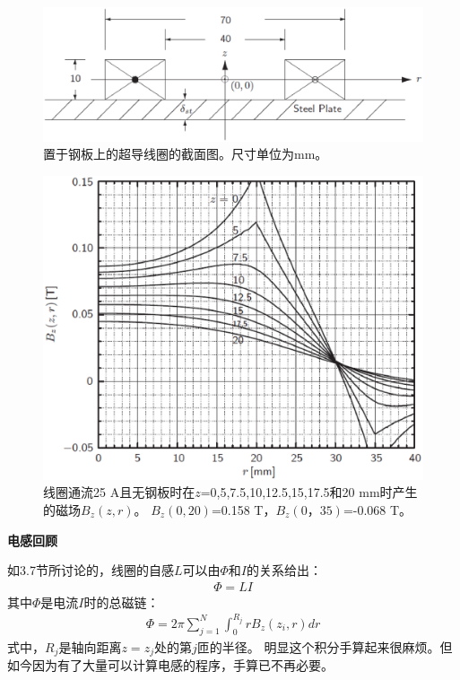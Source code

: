 \begin{figure}
	\centering
	\includegraphics[scale=0.5]{chpt9/figs/fig9.6.eps}
	\caption{置于钢板上的超导线圈的截面图。尺寸单位为mm。}
\end{figure}


\begin{figure}
	\centering
	\includegraphics[scale=0.5]{chpt9/figs/fig9.7.eps}
	\caption{线圈通流25 A且无钢板时在$z$=0,5,7.5,10,12.5,15,17.5和20 mm时产生的磁场$B_z(z,r)$。
		$B_z(0,20)$=0.158 T，$B_z(0，35)$=-0.068 T。}
\end{figure}

\textbf{电感回顾}

如3.7节所讨论的，线圈的自感$L$可以由$\Phi$和$I$的关系给出：
\begin{align*}%
\Phi=LI \tag{3.78}
\end{align*}
其中$\Phi$是电流$I$时的总磁链：
\begin{align*}%
\Phi=2\pi\sum_{j=1}^{N}\int_{0}^{R_j}rB_z(z_i,r)dr \tag{9.1}
\end{align*}
式中，$R_j$是轴向距离$z=z_j$处的第$j$匝的半径。
明显这个积分手算起来很麻烦。但如今因为有了大量可以计算电感的程序，手算已不再必要。

